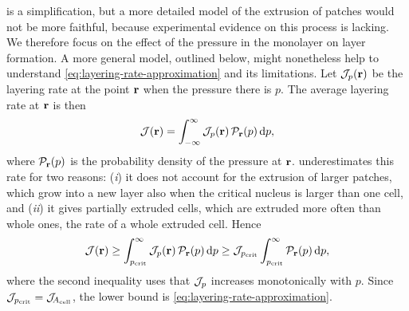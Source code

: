 \documentclass[aps,pre,reprint,superscriptaddress,longbibliography,nofootinbib
]{revtex4-2}
\begin{document}
 is a simplification,
but a more detailed model of the extrusion of patches would
not be more faithful, because experimental evidence on this
process is lacking. We therefore focus on the effect of the
pressure in the monolayer on layer formation. A more
general model, outlined below, might nonetheless help to
understand \cref{eq:layering-rate-approximation} and its
limitations. Let $\mathcal{J}_p(\mathbf{r})$ be the layering rate at the
point $\mathbf{r}$ when the pressure there is $p$. The average
layering rate at $\mathbf{r}$ is then
\begin{equation}
  \label{eq:layering-rate-average}
  \mathcal{J}(\mathbf{r}) = \int_{-\infty}^\infty \mathcal{J}_p(\mathbf{r})\,\mathcal{P}_{\mathbf{r}}(p)\,\mathrm{d} p,
\end{equation}
where $\mathcal{P}_{\mathbf{r}}(p)$ is the probability density of the
pressure at $\mathbf{r}$. 
underestimates this rate for two reasons: (\textit{i}) it
does not account for the extrusion of larger patches, which
grow into a new layer also when the critical nucleus is
larger than one cell, and (\textit{ii}) it gives partially
extruded cells, which are extruded more often than whole
ones, the rate of a whole extruded cell. Hence
\begin{align}
  \label{eq:underestimates}
  \mathcal{J}(\mathbf{r}) \geq \int_{p_{\rm crit}}^\infty \mathcal{J}_p(\mathbf{r})\,\mathcal{P}_{\mathbf{r}}(p)\,\mathrm{d} p
  \geq \mathcal{J}_{p_{\rm crit}} \int_{p_{\rm crit}}^\infty \mathcal{P}_{\mathbf{r}}(p)\,\mathrm{d} p ,
\end{align}
where the second inequality uses that $\mathcal{J}_p$ increases
monotonically with $p$. Since
$\mathcal{J}_{p_{\rm crit}}=\mathcal{J}_{\!{A_{\rm cell}}}$, the lower bound is
\cref{eq:layering-rate-approximation}.
\end{document}
